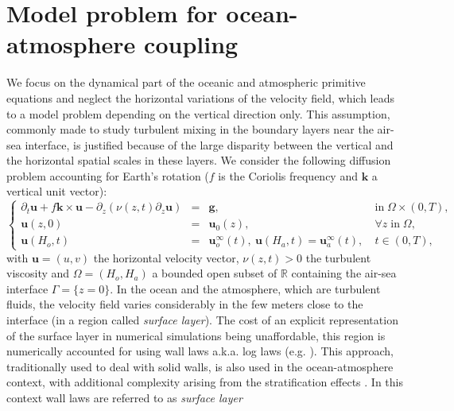\section{Model problem for ocean-atmosphere coupling}\label{sec:couplingProblem}
We focus on the dynamical part of the oceanic and atmospheric primitive equations and neglect the horizontal variations of 
the velocity field, which leads to a model problem  depending 
on the vertical direction only. This assumption, commonly made 
to study turbulent mixing in the boundary layers near the 
air-sea interface, is justified because of the large disparity 
between the vertical and the horizontal spatial scales in these layers. 
We consider the following diffusion problem accounting for Earth’s 
rotation ($f$ is the Coriolis frequency and $\mathbf{k}$ a vertical unit vector):
\begin{equation*}
\left\{
\begin{array}{rcll}
\partial_t \mathbf{u} + f \mathbf{k} \times \mathbf{u} - \partial_z \left( \nu(z,t) \partial_z \mathbf{u} \right) &=& \mathbf{g}, & \mbox{in}\;\Omega \times (0,T), \\
\mathbf{u}(z,0) &=& \mathbf{u}_0(z), & \forall z \; \mbox{in}\; \Omega, \\
\mathbf{u}(H_o,t) &=& \mathbf{u}_o^\infty(t), ~ \mathbf{u}(H_a,t) = \mathbf{u}_a^\infty(t), ~ & t \in (0,T),  
\end{array}
\right.
\end{equation*}
with $\mathbf{u} = (u,v)$ the horizontal velocity vector,
$\nu(z,t) > 0$ the turbulent viscosity and 
$\Omega = (H_o,H_a)$ a bounded open subset of $\mathbb{R}$
containing the air-sea interface $\Gamma = \{z = 0\}$.
In the ocean and the atmosphere, which are  turbulent fluids,
the velocity field varies considerably in the few 
meters close to the interface (in a region called 
\textit{surface layer}). The cost of an
explicit representation of the surface layer in numerical simulations being 
unaffordable, this region is numerically accounted for 
using wall laws a.k.a. log laws (e.g. \cite{mohammadi_rough_1998}). This approach, 
traditionally used to deal with solid walls, is also used
in the ocean-atmosphere context, with additional complexity 
arising from the stratification effects \cite{pelletier_two-sided_2021}.
In this context wall laws are referred to as \textit{surface layer} 
